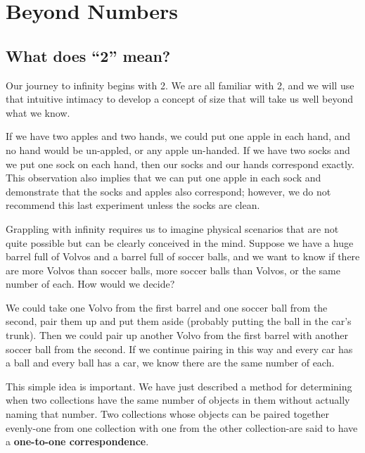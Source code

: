 \pagestyle{fancy}
\cleartooddpage

\chapter{Beyond Numbers}\label{ch:infinity}


\clearpage
\section{What does ``2'' mean?}

Our journey to infinity begins with 2. We are all familiar with 2, and we will use that intuitive
intimacy to develop a concept of size that will take us well beyond what we know.

If we have two apples and two hands, we could put one apple in each hand, and no hand would be un-appled, or any apple un-handed. If we have two socks and we put one sock on each hand, then our socks and
our hands correspond exactly. This observation also implies that we can put one apple in each sock and demonstrate that the socks and apples also correspond; however, we do not recommend this last experiment unless the socks are clean.


Grappling with infinity requires us to imagine physical scenarios that are not quite possible but can be clearly conceived in the mind. Suppose we have a huge barrel full of Volvos and a barrel full of soccer balls, and we want to know if there are more Volvos than soccer balls, more soccer
balls than Volvos, or the same number of each. How would we decide?

We could take one Volvo from the first barrel and one soccer ball from the second, pair them up and put them aside (probably putting the ball in the car's trunk). Then we could pair up another Volvo from the first barrel with another soccer ball from the second. If we continue pairing in this way and every car has a ball and every ball has a car, we know there are the same number of each.

This simple idea is important. We have just described a method for determining when two collections have the same number of objects in them without actually naming that number. Two collections whose objects can be paired together evenly-one from one collection with one from the other collection-are said to have a \textbf{one-to-one correspondence}.
\clearpage

